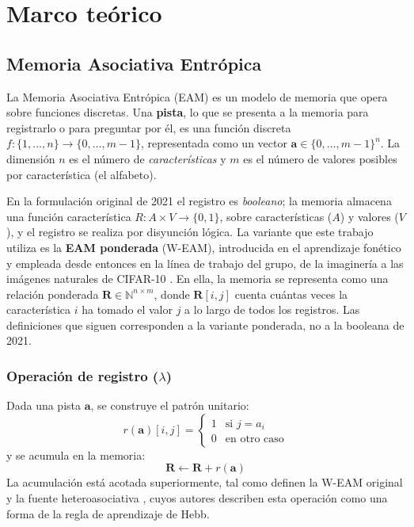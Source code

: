 \section{Marco teórico}
\label{sec:marco_teorico}

\subsection{Memoria Asociativa Entrópica}
\label{sec:eam}

La Memoria Asociativa Entrópica (EAM) \cite{pineda2021entropic} es un modelo de memoria
que opera sobre funciones discretas.
Una \textbf{pista}, lo que se presenta a la memoria para registrarlo o para preguntar por
él, es una función discreta $f : \{1, \ldots, n\} \to \{0, \ldots, m-1\}$,
representada como un vector $\mathbf{a} \in \{0, \ldots, m-1\}^n$.
La dimensión $n$ es el número de \emph{características} y $m$ es el número de valores posibles
por característica (el alfabeto).

En la formulación original de 2021 el registro es \emph{booleano}; la memoria almacena
una función característica $R : A \times V \to \{0, 1\}$, sobre características ($A$) y
valores ($V$), y el registro se realiza por disyunción lógica.
La variante que este trabajo utiliza es la \textbf{EAM ponderada} (W-EAM), introducida
en el aprendizaje fonético \cite{pineda2022weighted} y empleada desde entonces en la
línea de trabajo del grupo, de la imaginería a las imágenes naturales de
CIFAR-10 \cite{pineda2023imagery,hernandez2026cifar}.
En ella, la memoria se representa como una relación ponderada
$\mathbf{R} \in \mathbb{N}^{n \times m}$, donde $\mathbf{R}[i, j]$ cuenta cuántas veces la característica $i$ ha tomado el valor
$j$ a lo largo de todos los registros.
Las definiciones que siguen corresponden a la variante ponderada, no a la booleana de
2021.

\subsubsection*{Operación de registro ($\lambda$)}

Dada una pista $\mathbf{a}$, se construye el patrón unitario:
\begin{equation}
    r(\mathbf{a})[i, j] = \begin{cases} 1 & \text{si } j = a_i \\ 0 & \text{en otro caso} \end{cases}
    \label{eq:patron-unitario}
\end{equation}
y se acumula en la memoria:
\begin{equation}
    \mathbf{R} \leftarrow \mathbf{R} + r(\mathbf{a})
    \label{eq:registro}
\end{equation}
La acumulación está acotada superiormente, tal como definen la W-EAM original
\cite{pineda2022weighted} y la fuente heteroasociativa \cite{morales2025missing}, cuyos
autores describen esta operación como una forma de la regla de aprendizaje de Hebb.

